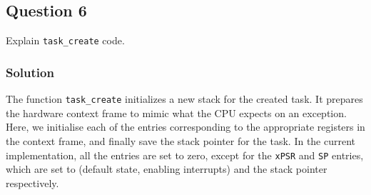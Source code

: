 \subsection*{Question 6}

Explain \texttt{task\_create} code.

\subsubsection*{Solution}

The function \texttt{task\_create} initializes a new stack for the created task.
It prepares the hardware context frame to mimic what the CPU expects on an exception.
Here, we initialise each of the entries corresponding to the appropriate registers in the context frame, and finally save the stack pointer for the task.
In the current implementation, all the entries are set to zero, except for the \texttt{xPSR} and \texttt{SP} entries, which are set to  (default state, enabling interrupts) and the stack pointer respectively.
